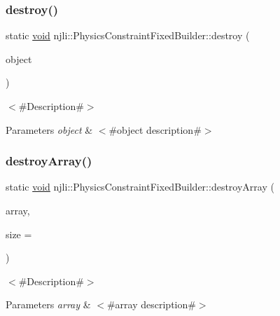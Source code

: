 \subsubsection{\texorpdfstring{destroy()}{destroy()}}
{\footnotesize\ttfamily static \mbox{\hyperlink{_thread_8h_af1e856da2e658414cb2456cb6f7ebc66}{void}} njli\+::\+Physics\+Constraint\+Fixed\+Builder\+::destroy (\begin{DoxyParamCaption}\item[{\mbox{\hyperlink{classnjli_1_1_physics_constraint_fixed_builder}{Physics\+Constraint\+Fixed\+Builder}} $\ast$}]{object }\end{DoxyParamCaption})\hspace{0.3cm}{\ttfamily [static]}}

$<$\#\+Description\#$>$


\begin{DoxyParams}{Parameters}
{\em object} & $<$\#object description\#$>$ \\
\hline
\end{DoxyParams}
\mbox{\label{classnjli_1_1_physics_constraint_fixed_builder_a1b4151563bccb912022a8399eb7ec41a}} 
\subsubsection{\texorpdfstring{destroy\+Array()}{destroyArray()}}
{\footnotesize\ttfamily static \mbox{\hyperlink{_thread_8h_af1e856da2e658414cb2456cb6f7ebc66}{void}} njli\+::\+Physics\+Constraint\+Fixed\+Builder\+::destroy\+Array (\begin{DoxyParamCaption}\item[{\mbox{\hyperlink{classnjli_1_1_physics_constraint_fixed_builder}{Physics\+Constraint\+Fixed\+Builder}} $\ast$$\ast$}]{array,  }\item[{const \mbox{\hyperlink{_util_8h_a10e94b422ef0c20dcdec20d31a1f5049}{u32}}}]{size = {} }\end{DoxyParamCaption})\hspace{0.3cm}{\ttfamily [static]}}

$<$\#\+Description\#$>$


\begin{DoxyParams}{Parameters}
{\em array} & $<$\#array description\#$>$ \\
\hline
\end{DoxyParams}
\mbox{\label{classnjli_1_1_physics_constraint_fixed_builder_a2bc42bf80feef43c24eee74e44840af9}} 
